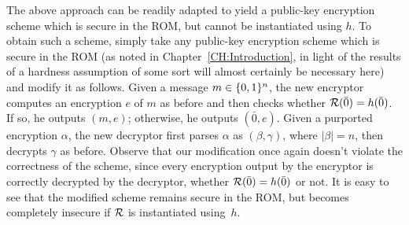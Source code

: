 The above approach can be readily adapted to yield a public-key encryption
scheme which is secure in the ROM, but cannot be instantiated using $h$. To
obtain such a scheme, simply take any public-key encryption scheme which is
secure in the ROM (as noted in Chapter~\ref{CH:Introduction}, in light of the
results of \cite{impagliazzo:nooneway} a hardness assumption of some sort will
almost certainly be necessary here) and modify it as follows. Given a message
$m \in \{0,1\}^{n}$, the new encryptor computes an encryption $e$ of $m$ as
before and then  checks whether $\mathcal{R}(\bar{0}) = h(\bar{0})$. If so, he
outputs $(m,e)$; otherwise, he outputs $(\bar{0},e)$. Given a purported
encryption $\alpha$, the new decryptor first parses $\alpha$ as
$(\beta,\gamma)$, where $|\beta| = n$, then decrypts $\gamma$ as before.
Observe that our modification once again doesn't violate the correctness of
the scheme, since every encryption output by the encryptor is correctly
decrypted by the decryptor, whether $\mathcal{R}(\bar{0}) = h(\bar{0})$ or not. It
is easy to see that the modified scheme remains secure in the ROM, but becomes
completely insecure if $\mathcal{R}$ is instantiated using~$h$.

